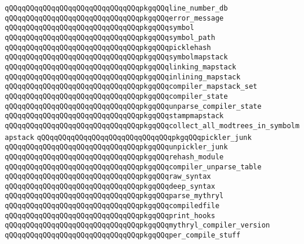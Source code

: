 \verb|qQQqqQQqqQQqqQQqqQQqqQQqqQQqqQQqpkgqQQqline_number_db|\newline
\verb|qQQqqQQqqQQqqQQqqQQqqQQqqQQqqQQqpkgqQQqerror_message|\newline
\verb|qQQqqQQqqQQqqQQqqQQqqQQqqQQqqQQqpkgqQQqsymbol|\newline
\verb|qQQqqQQqqQQqqQQqqQQqqQQqqQQqqQQqpkgqQQqsymbol_path|\newline
\verb|qQQqqQQqqQQqqQQqqQQqqQQqqQQqqQQqpkgqQQqpicklehash|\newline
\verb|qQQqqQQqqQQqqQQqqQQqqQQqqQQqqQQqpkgqQQqsymbolmapstack|\newline
\verb|qQQqqQQqqQQqqQQqqQQqqQQqqQQqqQQqpkgqQQqlinking_mapstack|\newline
\verb|qQQqqQQqqQQqqQQqqQQqqQQqqQQqqQQqpkgqQQqinlining_mapstack|\newline
\verb|qQQqqQQqqQQqqQQqqQQqqQQqqQQqqQQqpkgqQQqcompiler_mapstack_set|\newline
\verb|qQQqqQQqqQQqqQQqqQQqqQQqqQQqqQQqpkgqQQqcompiler_state|\newline
\verb|qQQqqQQqqQQqqQQqqQQqqQQqqQQqqQQqpkgqQQqunparse_compiler_state|\newline
\verb|qQQqqQQqqQQqqQQqqQQqqQQqqQQqqQQqpkgqQQqstampmapstack|\newline
\verb|qQQqqQQqqQQqqQQqqQQqqQQqqQQqqQQqpkgqQQqcollect_all_modtrees_in_symbolmapstack|\newline
\verb|qQQqqQQqqQQqqQQqqQQqqQQqqQQqqQQqpkgqQQqpickler_junk|\newline
\verb|qQQqqQQqqQQqqQQqqQQqqQQqqQQqqQQqpkgqQQqunpickler_junk|\newline
\verb|qQQqqQQqqQQqqQQqqQQqqQQqqQQqqQQqpkgqQQqrehash_module|\newline
\verb|qQQqqQQqqQQqqQQqqQQqqQQqqQQqqQQqpkgqQQqcompiler_unparse_table|\newline
\verb|qQQqqQQqqQQqqQQqqQQqqQQqqQQqqQQqpkgqQQqraw_syntax|\newline
\verb|qQQqqQQqqQQqqQQqqQQqqQQqqQQqqQQqpkgqQQqdeep_syntax|\newline
\verb|qQQqqQQqqQQqqQQqqQQqqQQqqQQqqQQqpkgqQQqparse_mythryl|\newline
\verb|qQQqqQQqqQQqqQQqqQQqqQQqqQQqqQQqpkgqQQqcompiledfile|\newline
\verb|qQQqqQQqqQQqqQQqqQQqqQQqqQQqqQQqpkgqQQqprint_hooks|\newline
\verb|qQQqqQQqqQQqqQQqqQQqqQQqqQQqqQQqpkgqQQqmythryl_compiler_version|\newline
\verb|qQQqqQQqqQQqqQQqqQQqqQQqqQQqqQQqpkgqQQqper_compile_stuff|\newline
